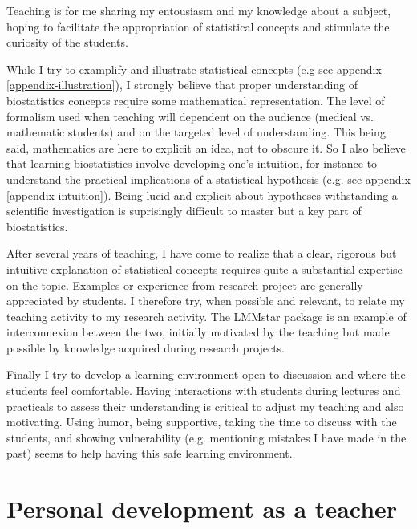 \documentclass[12pt]{article}
\begin{document}
Teaching is for me sharing my entousiasm and my knowledge about a
subject, hoping to facilitate the appropriation of statistical
concepts and stimulate the curiosity of the students.

\bigskip

While I try to examplify and illustrate statistical concepts (e.g see
appendix \ref{appendix-illustration}), I strongly believe that proper
understanding of biostatistics concepts require some mathematical
representation. The level of formalism used when teaching will
dependent on the audience (medical vs. mathematic students) and on the
targeted level of understanding. This being said, mathematics are here
to explicit an idea, not to obscure it. So I also believe that
learning biostatistics involve developing one's intuition, for instance
to understand the practical implications of a statistical hypothesis
(e.g. see appendix \ref{appendix-intuition}). Being lucid and explicit
about hypotheses withstanding a scientific investigation is
suprisingly difficult to master but a key part of biostatistics.

\bigskip

After several years of teaching, I have come to realize that a clear,
rigorous but intuitive explanation of statistical concepts requires
quite a substantial expertise on the topic. Examples or experience
from research project are generally appreciated by students. I
therefore try, when possible and relevant, to relate my teaching
activity to my research activity. The LMMstar package is an example of
interconnexion between the two, initially motivated by the teaching
but made possible by knowledge acquired during research projects.

\bigskip

Finally I try to develop a learning environment open to discussion and
where the students feel comfortable. Having interactions with students
during lectures and practicals to assess their understanding is
critical to adjust my teaching and also motivating. Using humor, being
supportive, taking the time to discuss with the students, and showing
vulnerability (e.g. mentioning mistakes I have made in the past) seems
to help having this safe learning environment.




\section{Personal development as a teacher}
\label{sec:orgfba8268}
\end{document}
